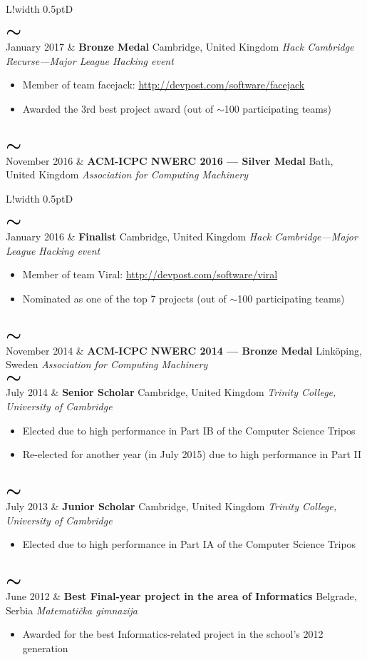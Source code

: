 \documentclass[11pt]{article}
\def\mysim{{\textcolor{maincolour}{$\LARGE\boldsymbol\sim$}}}
\newcommand{\VRule}{\color{lightgray}\vrule width 0.5pt}
\newcommand{\mytilde}[1]{\mysim \\ #1}
\newcommand{\cvtable}[1]{%
\begin{tabular}{L!{\VRule}D}#1\end{tabular}}
\newcommand{\mainitem}[4]{\textbf{#1} \hfill #3 \newline \emph{#2} \hfill #4}
\newcommand{\sitemize}[1]{%
	\vspace{0.5em}
	\begin{itemize}
		#1	
	\end{itemize}
}
\newcommand{\sitem}{\item[$\sim$]}
\begin{document}
\cvtable{%

\mytilde{January 2017} & \mainitem{Bronze Medal}{Hack Cambridge Recurse---Major League Hacking event}{Cambridge, United Kingdom}{}
\sitemize{%
	\sitem Member of team facejack: \url{http://devpost.com/software/facejack}
	\sitem Awarded the 3rd best project award (out of $\sim$100 participating teams)
}\vspace{-\baselineskip}\mbox{}
\\[5pt]

\mytilde{November 2016} & \mainitem{ACM-ICPC NWERC 2016 --- Silver Medal}{Association for Computing Machinery}{Bath, United Kingdom}{}
\\[5pt]

}
\cvtable{%

\mytilde{January 2016} & \mainitem{Finalist}{Hack Cambridge---Major League Hacking event}{Cambridge, United Kingdom}{}
	
\sitemize{%
	\sitem Member of team Viral: \url{http://devpost.com/software/viral}
	\sitem Nominated as one of the top 7 projects (out of $\sim$100 participating teams)
}\vspace{-\baselineskip}\mbox{}
\\[5pt]

\mytilde{November 2014} & \mainitem{ACM-ICPC NWERC 2014 --- Bronze Medal}{Association for Computing Machinery}{Link\"{o}ping, Sweden}{}
\\[5pt]

\mytilde{July 2014} & \mainitem{Senior Scholar}{Trinity College, University of Cambridge}{Cambridge, United Kingdom}{}
	
\sitemize{%
	\sitem Elected due to high performance in Part IB of the Computer Science Tripos
	\sitem Re-elected for another year (in July 2015) due to high performance in Part II
}\vspace{-\baselineskip}\mbox{}
\\[5pt]

\mytilde{July 2013} & \mainitem{Junior Scholar}{Trinity College, University of Cambridge}{Cambridge, United Kingdom}{}

\sitemize{%
	\sitem Elected due to high performance in Part IA of the Computer Science Tripos
}\vspace{-\baselineskip}\mbox{}
\\[5pt]

\mytilde{June 2012} & \mainitem{Best Final-year project in the area of Informatics}{Matemati\v{c}ka gimnazija}{Belgrade, Serbia}{}
\sitemize{%
	\sitem Awarded for the best Informatics-related project in the school's 2012 generation
}\vspace{-\baselineskip}\mbox{}
\\[5pt]

}
\end{document}
